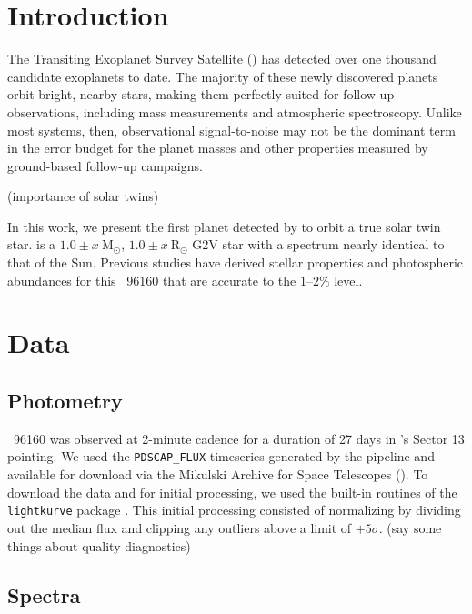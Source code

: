\documentclass[modern]{aastex62}
\newcommand{\hoststar}{\acronym{HIP}\ 96160\xspace}
\newcommand{\stmass}{$1.0 \pm x\ \textrm{M}_{\odot}$\xspace}
\newcommand{\stradius}{$1.0 \pm x\ \textrm{R}_{\odot}$\xspace}
\begin{document}
\section{Introduction}
\label{s:intro}

The Transiting Exoplanet Survey Satellite (\TESS) has detected over one thousand candidate exoplanets to date. 
The majority of these newly discovered planets orbit bright, nearby stars, making them perfectly suited for follow-up observations, including mass measurements and atmospheric spectroscopy. 
Unlike most \kepler systems, then, observational signal-to-noise may not be the dominant term in the error budget for the planet masses and other properties measured by ground-based follow-up campaigns.

(importance of solar twins)

In this work, we present the first planet detected by \TESS to orbit a true solar twin star. 
\object[HIP96160]{\hoststar} is a \stmass, \stradius G2V star with a spectrum nearly identical to that of the Sun. 
Previous studies have derived stellar properties and photospheric abundances for this \hoststar that are accurate to the $1\text{--}2\%$ level.



\section{Data}
\label{s:data}

\subsection{Photometry}

\hoststar was observed at 2-minute cadence for a duration of 27 days in \TESS's Sector 13 pointing. 
We used the \texttt{PDSCAP\_FLUX} timeseries generated by the \TESS pipeline and available for download via the Mikulski Archive for Space Telescopes (). 
To download the data and for initial processing, we used the built-in routines of the \texttt{lightkurve} package . 
This initial processing consisted of normalizing by dividing out the median flux and clipping any outliers above a limit of $+5\sigma$. 
(say some things about quality diagnostics)

\subsection{Spectra}
\end{document}
